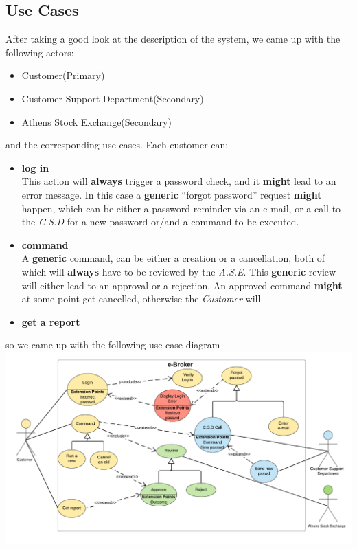 \documentclass{article}
\begin{document}
\subsection{Use Cases}
After taking a good look at the description of the system, we came up with the following actors:
\begin{itemize}
\item Customer(Primary)
\item Customer Support Department(Secondary)
\item Athens Stock Exchange(Secondary)
\end{itemize}
 and the corresponding use cases. Each customer can:
\begin{itemize}
\item \textbf{log in}\\This action will \textbf{always} trigger a password check, and it 
\textbf{might} lead to an error message. In this case a \textbf{generic} ``forgot password'' request \textbf{might} happen, which can be either a password reminder via an e-mail, or a call to the \textit{C.S.D} for a new password or/and a command to be executed.
\item \textbf{command}\\A \textbf{generic} command, can be either a creation or a cancellation, both of which will \textbf{always} have to be reviewed by the \textit{A.S.E}. This \textbf{generic} review will either lead to an approval or a rejection. An approved command \textbf{might} at some point get cancelled, otherwise the \textit{Customer} will 
\item \textbf{get a report}
\end{itemize}
so we came up with the following use case diagram\\
\includegraphics[scale=0.2]{use_cases}

\newpage
\end{document}
